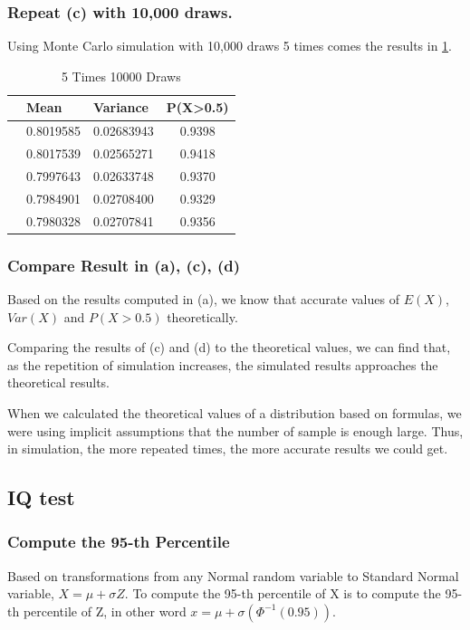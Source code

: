 \documentclass[12pt,letterpaper,titlepage,en-US]{article}
\begin{document}
\subsubsection{Repeat (c) with 10,000 draws.}
Using Monte Carlo simulation with 10,000 draws 5 times comes the results in \cref{110000}.
\begin{table}[H]
\centering
\begin{tabular}{|l|l|l|c|}
\hline
          &Mean   &Variance &P(X>0.5) \\\hline
[1,] &0.8019585 &0.02683943   &0.9398\\\hline
[2,] &0.8017539 &0.02565271   &0.9418\\\hline
[3,] &0.7997643 &0.02633748   &0.9370\\\hline
[4,] &0.7984901 &0.02708400   &0.9329\\\hline
[5,] &0.7980328 &0.02707841   &0.9356\\\hline
\end{tabular}
\caption{5 Times 10000 Draws}\label{110000}
\end{table}

\subsubsection{Compare Result in (a), (c), (d)}
Based on the results computed in (a), we know that accurate values of $E(X)$,
$Var(X)$ and $P(X > 0.5)$ theoretically.

Comparing the results of (c) and (d) to the theoretical values,
we can find that, as the repetition of simulation increases,
the simulated results approaches the theoretical results.

When we calculated the theoretical values of a distribution based on formulas,
we were using implicit assumptions that the number of sample is enough large.
Thus, in simulation, the more repeated times, the more accurate results we could get.

\subsection{IQ test}

\subsubsection{Compute the 95-th Percentile}
Based on transformations from any Normal random variable to Standard Normal variable,
$X = \mu + \sigma Z$. To compute the 95-th percentile of X is to compute the
95-th percentile of Z, in other word $x = \mu + \sigma(\Phi^{-1}(0.95))$.
\end{document}
